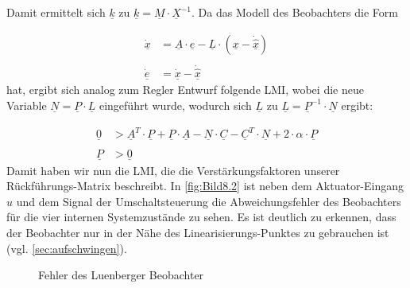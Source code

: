 Damit ermittelt sich $\underline{k}$ zu $\underline{k} = \underline{M} \cdot \underline{X}^{-1}$.
Da das Modell des Beobachters die Form

\begin{equation}
    \begin{split}
        \underline{\dot{x}} &= \underline{A} \cdot \underline{e} - \underline{L} \cdot ( \underline{x} - \underline{\dot{\hat{x}}} )\\\\\underline{\dot{e}} &= \underline{\dot{x}} - \underline{\dot{\hat{x}}}
    \end{split}
    \label{eq:Gleichung8.4}
\end{equation}
hat, ergibt sich analog zum Regler Entwurf folgende LMI, wobei die neue Variable $\underline{N} = \underline{P} \cdot \underline{L}$ eingeführt wurde, wodurch sich $\underline{L}$ zu $\underline{L} = \underline{P}^{-1} \cdot \underline{N}$ ergibt:

\begin{equation}
    \begin{split}
        \underline{0} &> \underline{A}^T \cdot \underline{P} + \underline{P} \cdot \underline{A} - \underline{N} \cdot \underline{C} - \underline{C}^T \cdot \underline{N} + 2 \cdot \alpha \cdot \underline{P}\\\\
        \underline{P} &> \underline{0}
    \end{split}
    \label{eq:Gleichung8.5}
\end{equation}
\newline
Damit haben wir nun die LMI, die die Verstärkungsfaktoren unserer Rückführungs-Matrix beschreibt.
In \autoref{fig:Bild8.2} ist neben dem Aktuator-Eingang $u$ und dem Signal der Umschaltsteuerung die Abweichungsfehler des Beobachters für die vier internen Systemzustände zu sehen. Es ist deutlich zu erkennen, dass der Beobachter nur in der Nähe des Linearisierungs-Punktes zu gebrauchen ist (vgl. \autoref{sec:aufschwingen}).

\begin{figure}[H]
   \centering
   \caption[Beobachter-Abweichung]{Fehler des Luenberger Beobachter}
   \label{fig:Bild8.2}
\end{figure}